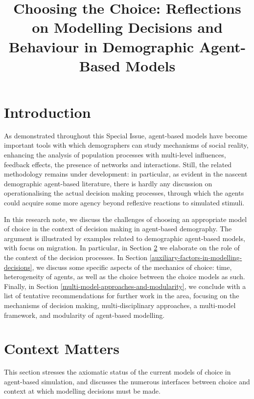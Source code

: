 \documentclass{article}
\begin{document}
\title{Choosing the Choice: Reflections on Modelling Decisions and Behaviour in Demographic Agent-Based Models}

\maketitle

\section{Introduction}
\label{sec:intro}

As demonstrated throughout this Special Issue, agent-based models have become important tools with which demographers can study mechanisms of social reality, enhancing the analysis of population processes with multi-level influences, feedback effects, the presence of networks and interactions. Still, the related methodology remains under development: in particular, as evident in the nascent demographic agent-based literature, there is hardly any discussion on operationalising the actual decision making processes, through which the agents could acquire some more agency beyond reflexive reactions to simulated stimuli. 

In this research note, we discuss the challenges of choosing an appropriate model of choice in the context of decision making in agent-based demography. The argument is illustrated by examples related to demographic agent-based models, with focus on migration. In particular, in Section \ref{sec:context_matters} we elaborate on the role of the context of the decision processes. In Section \ref{auxiliary-factors-in-modelling-decisions}, we discuss some specific aspects of the mechanics of choice: time, heterogeneity of agents, as well as the choice between the choice models as such. Finally, in Section \ref{multi-model-approaches-and-modularity}, we conclude with a list of tentative recommendations for further work in the area, focusing on the mechanisms of decision making, multi-disciplinary approaches, a multi-model framework, and modularity of agent-based modelling.


\section{Context Matters}
\label{sec:context_matters}

This section stresses the axiomatic status of the current models of choice in agent-based simulation, and discusses the numerous interfaces between choice and context at which modelling decisions must be made.
\end{document}
